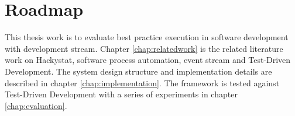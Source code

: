 \section{Roadmap}
This thesis work is to evaluate best practice execution in software development 
with development stream. Chapter \ref{chap:relatedwork} is the related
literature work on Hackystat, software process automation, event stream and
Test-Driven Development. The system design structure and implementation details
are described in chapter \ref{chap:implementation}. The framework is tested
against Test-Driven Development with a series of experiments in 
chapter \ref{chap:evaluation}.

